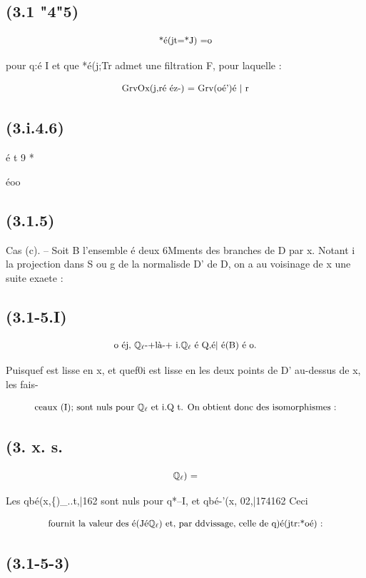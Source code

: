 \documentclass[11pt]{article}
\theoremstyle{remark}
\begin{document}
\subsection*{(3.1 "4"5)}

\[\text{\small *é(jt=*J) =o}\]

pour q:é I et que *é(j;Tr admet une filtration F, pour laquelle :

\[\text{\small GrvOx(j,ré éz-) = Grv(oé')é | r}\]

\subsection*{(3.i.4.6)}

é t  9 *

éoo

\subsection*{(3.1.5)}

Cas (c). -- Soit B l'ensemble é deux 6Mments des branches de D par x. Notant i la projection dans S ou g de la normalisde D' de D, on a au voisinage de x une suite exaete :

\subsection*{(3.1-5.I)}

\[\text{\small o éj, \(\mathbb{Q}_{\ell}\)-+là-+ i.\(\mathbb{Q}_{\ell}\) é Q,é| é(B) é o.}\]

Puisquef est lisse en x, et quef0i est lisse en les deux points de D' au-dessus de x, les fais-

\[\text{\small ceaux (I); sont nuls pour \(\mathbb{Q}_{\ell}\) et i.Q t. On obtient donc des isomorphismes :}\]

\subsection*{(3. x. s.}

\[\text{\small \(\mathbb{Q}_{\ell}\)) =}\]

Les qbé(x,\{)\_..t,|162 sont nuls pour q*--I, et qbé-'(x, 02,|174162 Ceci

\[\text{\small fournit la valeur des é(Jé\(\mathbb{Q}_{\ell}\)) et, par ddvissage, celle de q)é(jtr:*oé) :}\]

\subsection*{(3.1-5-3)}
\end{document}
